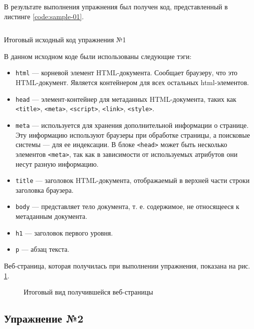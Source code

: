 \documentclass[a4paper, 14pt]{extarticle}
\newenvironment{code}{\captionsetup{type=listing}}{}
\begin{document}
В результате выполнения упражнения был получен код, представленный в листинге
\ref{code:sample-01}.

\begin{code}
  \inputminted{html}{../task-1/Sample01.html}
  \caption{Итоговый исходный код упражнения №1}
  \label{code:sample-01}
\end{code}

В данном исходном коде были использованы следующие тэги:
\begin{itemize}
  \item \texttt{html} --- корневой элемент HTML-документа. Сообщает браузеру,
  что это HTML-документ. Является контейнером для всех остальных
  html-элементов.
  \item \texttt{head} --- элемент-контейнер для метаданных HTML-документа,
  таких как \texttt{<title>}, \texttt{<meta>}, \texttt{<script>},
  \texttt{<link>}, \texttt{<style>}.
  \item \texttt{meta} --- используется для хранения дополнительной информации о
  странице. Эту информацию используют браузеры при обработке страницы, а
  поисковые системы — для ее индексации. В блоке \texttt{<head>} может
  быть несколько элементов \texttt{<meta>}, так как в зависимости от
  используемых атрибутов они несут разную информацию.
  \item \texttt{title} --- заголовок HTML-документа, отображаемый в верхней
  части строки заголовка браузера.
  \item \texttt{body} --- представляет тело документа, т. е. содержимое, не
  относящееся к метаданным документа.
  \item \texttt{h1} --- заголовок первого уровня.
  \item \texttt{p} --- абзац текста.
\end{itemize}

Веб-страница, которая получилась при выполнении упражнения, показана на рис.
\ref{fig:task-1}.

\begin{figure}[H]
  \centering
  \caption{Итоговый вид получившейся веб-страницы}
  \label{fig:task-1}
\end{figure}

\subsection{Упражнение №2}
\end{document}
